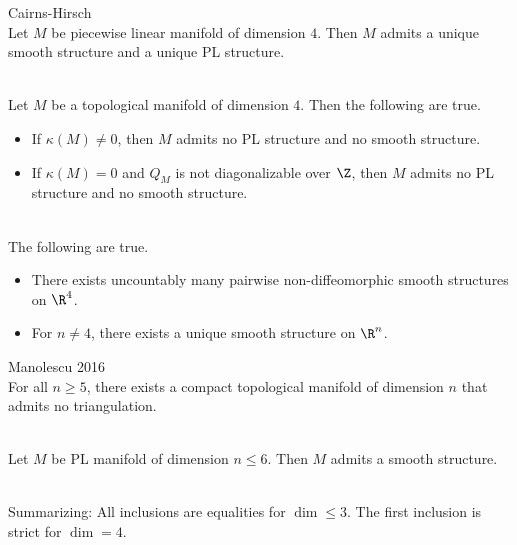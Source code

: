 \documentclass[a4paper]{article}
\begin{document}
\begin{thm}{Cairns-Hirsch}{}\\
Let $M$ be piecewise linear manifold of dimension $4$. Then $M$ admits a unique smooth structure and a unique PL structure. 
\end{thm}

\begin{thm}{}{}\\
Let $M$ be a topological manifold of dimension $4$. Then the following are true. 
\begin{itemize}
\item If $\kappa(M)\neq 0$, then $M$ admits no PL structure and no smooth structure. 
\item If $\kappa(M)=0$ and $Q_M$ is not diagonalizable over $\Z$, then $M$ admits no PL structure and no smooth structure. 
\end{itemize}
\end{thm}

\begin{thm}{}{}\\
The following are true. 
\begin{itemize}
\item There exists uncountably many pairwise non-diffeomorphic smooth structures on $\R^4$. 
\item For $n\neq 4$, there exists a unique smooth structure on $\R^n$. 
\end{itemize}
\end{thm}

\begin{thm}{Manolescu 2016}{}\\
For all $n\geq 5$, there exists a compact topological manifold of dimension $n$ that admits no triangulation. 
\end{thm}

\begin{thm}{}{}\\
Let $M$ be PL manifold of dimension $n\leq 6$. Then $M$ admits a smooth structure. 
\end{thm}

\\
Summarizing: All inclusions are equalities for $\dim\leq 3$. The first inclusion is strict for $\dim=4$. 
\end{document}
